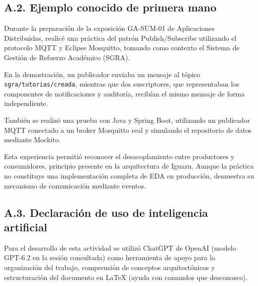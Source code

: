 \subsection*{A.2. Ejemplo conocido de primera mano}

Durante la preparación de la exposición GA-SUM-01 de Aplicaciones Distribuidas, realicé una práctica del patrón Publish/Subscribe utilizando el protocolo MQTT y Eclipse Mosquitto, tomando como contexto el Sistema de Gestión de Refuerzo Académico (SGRA).

En la demostración, un publicador enviaba un mensaje al tópico \texttt{sgra/tutorias/creada}, mientras que dos suscriptores, que representaban los componentes de notificaciones y auditoría, recibían el mismo mensaje de forma independiente.

También se realizó una prueba con Java y Spring Boot, utilizando un publicador MQTT conectado a un broker Mosquitto real y simulando el repositorio de datos mediante Mockito.

Esta experiencia permitió reconocer el desacoplamiento entre productores y consumidores, principio presente en la arquitectura de Iguazu. Aunque la práctica no constituye una implementación completa de EDA en producción, demuestra su mecanismo de comunicación mediante eventos.

\subsection*{A.3. Declaración de uso de inteligencia artificial}

Para el desarrollo de esta actividad se utilizó ChatGPT de OpenAI (modelo GPT-6.2 en la sesión consultada) como herramienta de apoyo para la organización del trabajo, comprensión de conceptos arquitectónicos y estructuración del documento en LaTeX (ayuda con comandos que desconozco).
